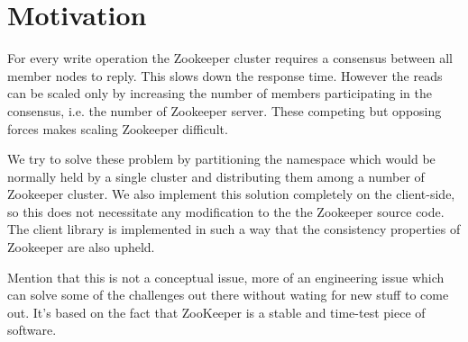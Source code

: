 \chapter{Motivation}
For every write operation the Zookeeper cluster requires a consensus between all member nodes to reply. This slows down the response time. However the reads can be scaled only by increasing the number of members participating in the consensus, i.e. the number of Zookeeper server. These competing but opposing forces makes scaling Zookeeper difficult. 

We try to solve these problem by partitioning the namespace which would be normally held by a single cluster and distributing them among a number of Zookeeper cluster. We also implement this solution completely on the client-side, so this does not necessitate any modification to the the Zookeeper source code. The client library is implemented in such a way that the consistency properties of Zookeeper are also upheld.

Mention that this is not a conceptual issue, more of an engineering issue which can solve some of the challenges out there without wating for new stuff to come out. It's based on the fact that ZooKeeper is a stable and time-test piece of software.

